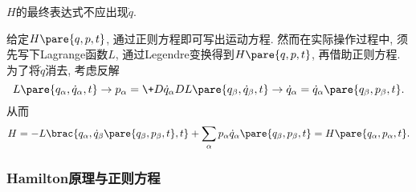 \documentclass{ctexart}
\begin{document}
\begin{pitfall}
    $H$的最终表达式不应出现$\dot{q}$.
\end{pitfall}
给定$H\pare{q,p,t}$, 通过正则方程即可写出运动方程. 然而在实际操作过程中, 须先写下Lagrange函数$L$, 通过Legendre变换得到$H\pare{q,p,t}$, 再借助正则方程. 为了将$\dot{q}$消去, 考虑反解
\[ L\pare{q_\alpha,\dot{q}_\alpha,t} \rightarrow p_\alpha = \+D{\dot{q}_\alpha} DL\pare{q_\beta,\dot{q}_\beta, t} \rightarrow \dot{q}_\alpha = \dot{q}_\alpha \pare{q_\beta, p_\beta, t}. \]
从而
\[ H = -L\brac{q_\alpha, \dot{q}_\beta\pare{q_\beta,p_\beta,t},t} + \sum_\alpha p_\alpha\dot{q}_\alpha\pare{q_\beta,p_\beta,t} = H\pare{q_\alpha,p_\alpha,t}. \]



\subsubsection{Hamilton原理与正则方程} %
\label{ssub:hamilton原理与正则方程}
\end{document}
